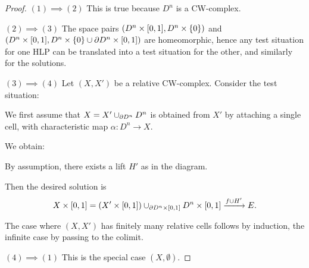 \begin{proof}

$(1)\implies(2)$ This is true because $D^n$ is a CW-complex.

$(2)\implies(3)$ The space pairs $(D^n\times[0,1],D^n\times\{0\})$ and $(D^n\times[0,1],D^n\times\{0\}\cup\partial D^n\times[0,1])$ are homeomorphic, hence any test situation for one HLP can be translated into a test situation for the other, and similarly for the solutions.

$(3)\implies(4)$ Let $(X,X')$ be a relative CW-complex. Consider the test situation:
\begin{center}
\end{center}

We first assume that $X=X'\cup_{\partial D^n}D^n$ is obtained from $X'$ by attaching a single cell, with characteristic map $\alpha:D^n\to X$.

We obtain:

\begin{center}
\end{center}

By assumption, there exists a lift $H'$ as in the diagram.

Then the desired solution is
\[X\times[0,1]=(X'\times[0,1])\cup_{\partial D^n\times[0,1]}D^n\times[0,1]\xrightarrow{f\cup H'}E.\]

The case where $(X,X')$ has finitely many relative cells follows by induction, the infinite case by passing to the colimit.

$(4)\implies(1)$ This is the special case $(X,\emptyset)$.
\end{proof}

